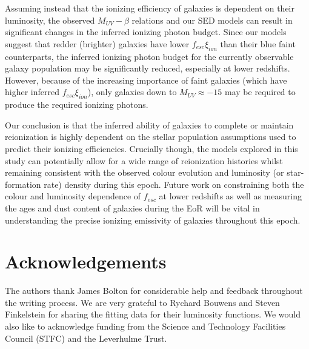 Assuming instead that the ionizing efficiency of galaxies is dependent on their luminosity, the observed $M_{UV} - \beta$ relations and our SED models can result in significant changes in the inferred ionizing photon budget. Since our models suggest that redder (brighter) galaxies have lower $f_{esc}\xi_{ion}$ than their blue faint counterparts, the inferred ionizing photon budget for the currently observable galaxy population may be significantly reduced, especially at lower redshifts. However, because of the increasing importance of faint galaxies (which have higher inferred $f_{esc}\xi_{ion}$), only galaxies down to $M_{UV} \approx -15$ may be required to produce the required ionizing photons.

Our conclusion is that the inferred ability of galaxies to complete or maintain reionization is highly dependent on the stellar population assumptions used to predict their ionizing efficiencies. Crucially though, the models explored in this study can potentially allow for a wide range of reionization histories whilst remaining consistent with the observed colour evolution and luminosity (or star-formation rate) density during this epoch. Future work on constraining both the colour and luminosity dependence of $f_{esc}$ at lower redshifts as well as measuring the ages and dust content of galaxies during the EoR will be vital in understanding the precise ionizing emissivity of galaxies throughout this epoch.

\section*{Acknowledgements}
The authors thank James Bolton for considerable help and feedback throughout the writing process. We are very grateful to Rychard Bouwens and Steven Finkelstein for sharing the fitting data for their luminosity functions. We would also like to acknowledge funding from the Science and Technology Facilities Council (STFC) and the Leverhulme Trust.

